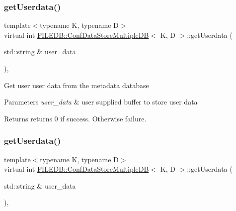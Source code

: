 \subsubsection{\texorpdfstring{getUserdata()}{getUserdata()}\hspace{0.1cm}{\footnotesize\ttfamily [2/3]}}
{\footnotesize\ttfamily template$<$typename K, typename D$>$ \\
virtual int \mbox{\hyperlink{classFILEDB_1_1ConfDataStoreMultipleDB}{F\+I\+L\+E\+D\+B\+::\+Conf\+Data\+Store\+Multiple\+DB}}$<$ K, D $>$\+::get\+Userdata (\begin{DoxyParamCaption}\item[{std\+::string \&}]{user\+\_\+data }\end{DoxyParamCaption})\hspace{0.3cm}{\ttfamily [inline]}, {\ttfamily [virtual]}}

Get user user data from the metadata database


\begin{DoxyParams}{Parameters}
{\em user\+\_\+data} & user supplied buffer to store user data \\
\hline
\end{DoxyParams}
\begin{DoxyReturn}{Returns}
returns 0 if success. Otherwise failure. 
\end{DoxyReturn}
\mbox{\label{classFILEDB_1_1ConfDataStoreMultipleDB_aa3f101137804c73d44e2d87538acc014}} 
\subsubsection{\texorpdfstring{getUserdata()}{getUserdata()}\hspace{0.1cm}{\footnotesize\ttfamily [3/3]}}
{\footnotesize\ttfamily template$<$typename K, typename D$>$ \\
virtual int \mbox{\hyperlink{classFILEDB_1_1ConfDataStoreMultipleDB}{F\+I\+L\+E\+D\+B\+::\+Conf\+Data\+Store\+Multiple\+DB}}$<$ K, D $>$\+::get\+Userdata (\begin{DoxyParamCaption}\item[{std\+::string \&}]{user\+\_\+data }\end{DoxyParamCaption})\hspace{0.3cm}{\ttfamily [inline]}, {\ttfamily [virtual]}}


